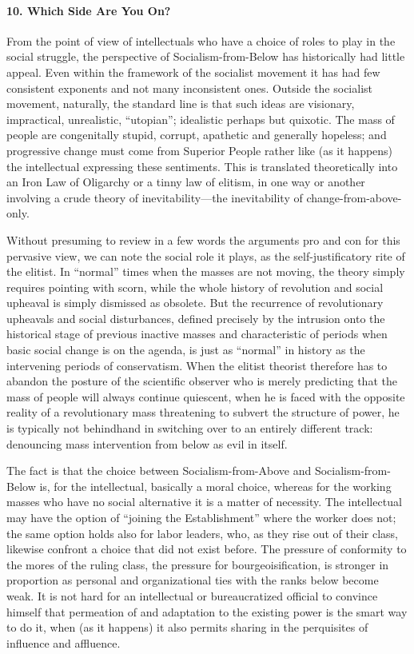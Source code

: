 \paragraph{10. Which Side Are You On?}

From the point of view of intellectuals who have a choice of roles to play in the social struggle, the perspective of Socialism-from-Below has historically had little appeal. Even within the framework of the socialist movement it has had few consistent exponents and not many inconsistent ones. Outside the socialist movement, naturally, the standard line is that such ideas are visionary, impractical, unrealistic, ``utopian''; idealistic perhaps but quixotic. The mass of people are congenitally stupid, corrupt, apathetic and generally hopeless; and progressive change must come from Superior People rather like (as it happens) the intellectual expressing these sentiments. This is translated theoretically into an Iron Law of Oligarchy or a tinny law of elitism, in one way or another involving a crude theory of inevitability---the inevitability of change-from-above-only.

Without presuming to review in a few words the arguments pro and con for this pervasive view, we can note the social role it plays, as the self-justificatory rite of the elitist. In ``normal'' times when the masses are not moving, the theory simply requires pointing with scorn, while the whole history of revolution and social upheaval is simply dismissed as obsolete. But the recurrence of revolutionary upheavals and social disturbances, defined precisely by the intrusion onto the historical stage of previous inactive masses and characteristic of periods when basic social change is on the agenda, is just as ``normal'' in history as the intervening periods of conservatism. When the elitist theorist therefore has to abandon the posture of the scientific observer who is merely predicting that the mass of people will always continue quiescent, when he is faced with the opposite reality of a revolutionary mass threatening to subvert the structure of power, he is typically not behindhand in switching over to an entirely different track: denouncing mass intervention from below as evil in itself.

The fact is that the choice between Socialism-from-Above and Socialism-from-Below is, for the intellectual, basically a moral choice, whereas for the working masses who have no social alternative it is a matter of necessity. The intellectual may have the option of ``joining the Establishment'' where the worker does not; the same option holds also for labor leaders, who, as they rise out of their class, likewise confront a choice that did not exist before. The pressure of conformity to the mores of the ruling class, the pressure for bourgeoisification, is stronger in proportion as personal and organizational ties with the ranks below become weak. It is not hard for an intellectual or bureaucratized official to convince himself that permeation of and adaptation to the existing power is the smart way to do it, when (as it happens) it also permits sharing in the perquisites of influence and affluence.

